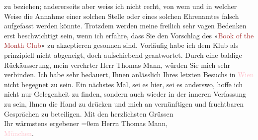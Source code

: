               zu beziehen; andererseits aber weiss ich nicht recht, von wem und in welcher Weise
               die Annahme einer solchen Stelle oder eines solchen Ehrenamtes falsch aufgefasst
               werden könnte. Trotzdem werden meine freilich sehr vagen Bedenken erst beschwichtigt
               sein, wenn ich erfahre, dass Sie den Vorschlag des »\textcolor{brown}{Book
                  of the Month Club}{}\ledrightnote{\textcolor{brown}{Book of The Month Club}}« zu akzeptieren gesonnen sind. Vorläufig habe ich dem Klub
               als prinzipiell nicht abgeneigt, doch aufschiebend geantwortet. Durch eine baldige
               Rückäusserung, mein verehrter Herr Thomas Mann, würden Sie mich sehr verbinden.\pend
           \pstart
           Ich habe sehr bedauert\introOben{},\introOben{} Ihnen anlässlich Ihres letzten
               Besuchs in \textcolor{pink}{Wien}{}\ledrightnote{\textcolor{pink}{Wien}} nicht begegnet zu sein. Ein nächstes
               Mal, sei es hier, sei es anderswo, hoffe ich nicht nur Gelegenheit zu finden, sondern auch  wieder in der inneren Verfassung zu sein\introOben{},\introOben{}
               Ihnen die Hand zu drücken und mich an vernünftigen und fruchtbaren Gesprächen zu
               beteiligen.\pend
           \pstart
           Mit den herzlichsten Grüssen{\\[\baselineskip]}Ihr wärmstens ergebener\pend
           \leftskip=0em{}{\bigskip}\pstart
           \noindent{}Herrn Thomas Mann,{\\}\textcolor{pink}{München}{}\ledrightnote{\textcolor{pink}{München}}.\pend
           \endnumbering{}  
      